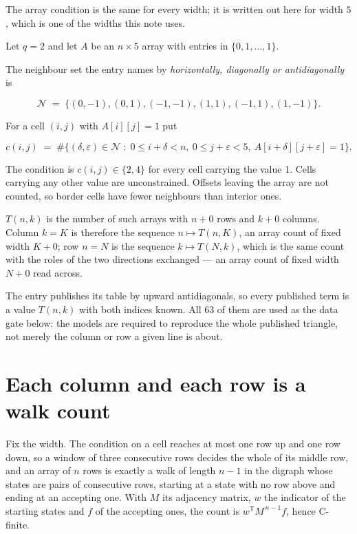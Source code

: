 \documentclass[11pt]{article}
\theoremstyle{definition}
\begin{document}
The array condition is the same for every width; it is written out here for width $5$, which is one of the widths this note uses.

Let $q = 2$ and let $A$ be an $n \times 5$ array with entries in $\{0,1,\dots,1\}$.

The neighbour set the entry names by {\itshape horizontally, diagonally or antidiagonally} is

\[\mathcal{N} \;=\; \{(0,-1), (0,1), (-1,-1), (1,1), (-1,1), (1,-1)\}.\]

For a cell $(i,j)$ with $A[i][j] = 1$ put

\[c(i,j) \;=\; \#\bigl\{(\delta,\varepsilon)\in\mathcal{N} \;:\; 0\le i+\delta<n,\ 0\le j+\varepsilon<5,\ A[i+\delta][j+\varepsilon] = 1\bigr\}.\]

The condition is $c(i,j) \in \{2, 4\}$ for every cell carrying the value 1. Cells carrying any other value are unconstrained. Offsets leaving the array are not counted, so border cells have fewer neighbours than interior ones.

$T(n,k)$ is the number of such arrays with $n + 0$ rows and $k + 0$ columns. Column $k = K$ is therefore the sequence $n \mapsto T(n,K)$, an array count of fixed width $K + 0$; row $n = N$ is the sequence $k \mapsto T(N,k)$, which is the same count with the roles of the two directions exchanged --- an array count of fixed width $N + 0$ read across.

The entry publishes its table by upward antidiagonals, so every published term is a value $T(n,k)$ with both indices known. All 63 of them are used as the data gate below: the models are required to reproduce the whole published triangle, not merely the column or row a given line is about.

\section{Each column and each row is a walk count}

Fix the width. The condition on a cell reaches at most one row up and one row down, so a window of three consecutive rows decides the whole of its middle row, and an array of $n$ rows is exactly a walk of length $n-1$ in the digraph whose states are pairs of consecutive rows, starting at a state with no row above and ending at an accepting one. With $M$ its adjacency matrix, $w$ the indicator of the starting states and $f$ of the accepting ones, the count is $w^{\mathsf T}M^{\,n-1}f$, hence C-finite.
\end{document}
